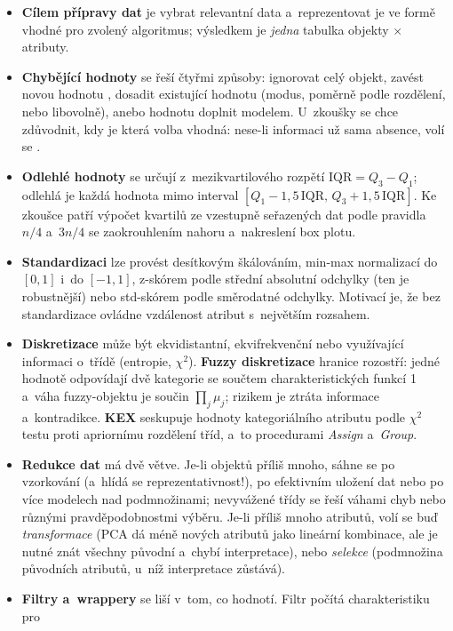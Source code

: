\documentclass[11pt,a4paper]{article}
\theoremstyle{definition}
\begin{document}
\begin{itemize}
\item \textbf{Cílem přípravy dat} je vybrat relevantní data a~reprezentovat je ve formě
      vhodné pro zvolený algoritmus; výsledkem je \emph{jedna} tabulka objekty $\times$
      atributy.
\item \textbf{Chybějící hodnoty} se řeší čtyřmi způsoby: ignorovat celý objekt, zavést novou
      hodnotu , dosadit existující hodnotu (modus, poměrně podle rozdělení, nebo
      libovolně), anebo hodnotu doplnit modelem. U~zkoušky se chce zdůvodnit, kdy je která
      volba vhodná: nese-li informaci už sama absence, volí se .
\item \textbf{Odlehlé hodnoty} se určují z~mezikvartilového rozpětí $\mathrm{IQR}=Q_3-Q_1$;
      odlehlá je každá hodnota mimo interval
      $[Q_1-1{,}5\,\mathrm{IQR},\,Q_3+1{,}5\,\mathrm{IQR}]$. Ke zkoušce patří výpočet kvartilů
      ze vzestupně seřazených dat podle pravidla $n/4$ a~$3n/4$ se zaokrouhlením nahoru
      a~nakreslení box plotu.
\item \textbf{Standardizaci} lze provést desítkovým škálováním, min-max normalizací do
      $[0,1]$ i~do $[-1,1]$, z-skórem podle střední absolutní odchylky (ten je robustnější)
      nebo std-skórem podle směrodatné odchylky. Motivací je, že bez standardizace ovládne
      vzdálenost atribut s~největším rozsahem.
\item \textbf{Diskretizace} může být ekvidistantní, ekvifrekvenční nebo využívající informaci
      o~třídě (entropie, $\chi^2$). \textbf{Fuzzy diskretizace} hranice rozostří: jedné
      hodnotě odpovídají dvě kategorie se součtem charakteristických funkcí 1 a~váha
      fuzzy-objektu je součin $\prod_j\mu_j$; rizikem je ztráta informace a~kontradikce.
      \textbf{KEX} seskupuje hodnoty kategoriálního atributu podle $\chi^2$ testu proti
      apriornímu rozdělení tříd, a~to procedurami \emph{Assign} a~\emph{Group}.
\item \textbf{Redukce dat} má dvě větve. Je-li objektů příliš mnoho, sáhne se po vzorkování
      (a~hlídá se reprezentativnost!), po efektivním uložení dat nebo po více modelech nad
      podmnožinami; nevyvážené třídy se řeší váhami chyb nebo různými pravděpodobnostmi
      výběru. Je-li příliš mnoho atributů, volí se buď \emph{transformace} (PCA dá méně nových
      atributů jako lineární kombinace, ale je nutné znát všechny původní a~chybí
      interpretace), nebo \emph{selekce} (podmnožina původních atributů, u~níž interpretace
      zůstává).
\item \textbf{Filtry a~wrappery} se liší v~tom, co hodnotí. Filtr počítá charakteristiku pro

\end{itemize}
\end{document}
